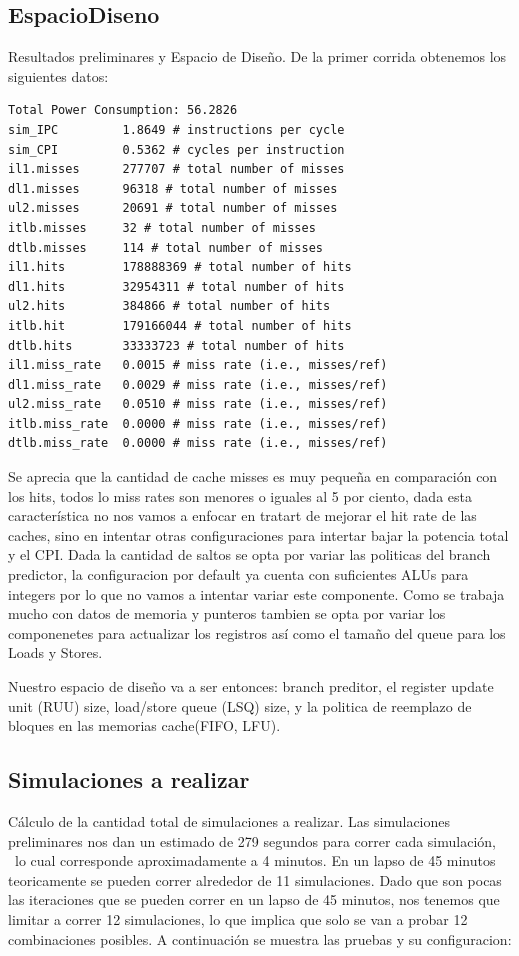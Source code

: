 \documentclass[journal]{IEEEtran}
\begin{document}
\subsection{EspacioDiseno}
Resultados preliminares y Espacio de Dise\~no.
De la primer corrida obtenemos los siguientes datos: \newline
\footnotesize \begin{verbatim}
Total Power Consumption: 56.2826
sim_IPC         1.8649 # instructions per cycle
sim_CPI         0.5362 # cycles per instruction
il1.misses      277707 # total number of misses
dl1.misses      96318 # total number of misses
ul2.misses      20691 # total number of misses
itlb.misses     32 # total number of misses
dtlb.misses     114 # total number of misses
il1.hits        178888369 # total number of hits
dl1.hits        32954311 # total number of hits
ul2.hits        384866 # total number of hits
itlb.hit        179166044 # total number of hits
dtlb.hits       33333723 # total number of hits
il1.miss_rate   0.0015 # miss rate (i.e., misses/ref)
dl1.miss_rate   0.0029 # miss rate (i.e., misses/ref)
ul2.miss_rate   0.0510 # miss rate (i.e., misses/ref)
itlb.miss_rate  0.0000 # miss rate (i.e., misses/ref)
dtlb.miss_rate  0.0000 # miss rate (i.e., misses/ref)
\end{verbatim}
\normalsize

Se aprecia que la cantidad de cache misses es muy peque\~na en comparaci\'on con los hits, todos lo miss rates son menores o iguales al 5 por ciento, dada esta caracter\'istica no nos vamos a enfocar en tratart de mejorar el hit rate de las caches, sino en intentar otras configuraciones para intertar bajar la potencia total y el CPI.
Dada la cantidad de saltos se opta por variar las politicas del branch predictor, la configuracion por default ya cuenta con suficientes ALUs para integers por lo que no vamos a intentar variar este componente.  Como se trabaja mucho con datos de memoria y punteros tambien se opta por variar los componenetes para actualizar los registros as\'i como el tama\~no del queue para los Loads y Stores.

Nuestro espacio de dise\~no va a ser entonces: branch preditor, el register update unit (RUU) size, load/store queue (LSQ) size, y la politica de reemplazo de bloques en las memorias cache(FIFO, LFU).

\subsection{Simulaciones a realizar}
C\'{a}lculo de la cantidad total de simulaciones a realizar.
Las simulaciones preliminares nos dan un estimado de 279 segundos para correr cada simulaci\'{o}n, \
lo cual corresponde aproximadamente a 4 minutos.  En un lapso de 45 minutos teoricamente se pueden correr alrededor de 11 simulaciones. Dado que son pocas las iteraciones que se pueden correr en un lapso de 45 minutos,
nos tenemos que limitar a correr 12 simulaciones, lo que implica que solo se van a probar 12 combinaciones posibles.
A continuaci\'{o}n se muestra las pruebas y su configuracion: \newline
\end{document}
